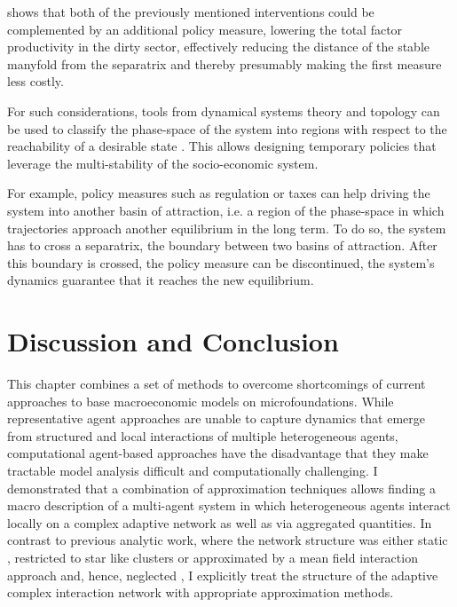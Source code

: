  shows that both of the previously mentioned interventions could be complemented by an additional policy measure, lowering the total factor productivity in the dirty sector, effectively reducing the distance of the stable manyfold from the separatrix and thereby presumably making the first measure less costly.

For such considerations, tools from dynamical systems theory and topology can be used to classify the phase-space of the system into regions with respect to the reachability of a desirable state \citep{Heitzig2016,Nitzbon2017}. This allows designing temporary policies that leverage the multi-stability of the socio-economic system.

For example, policy measures such as regulation or taxes can help driving the system into another basin of attraction, i.e. a region of the phase-space in which trajectories approach another equilibrium in the long term. To do so, the system has to cross a separatrix, the boundary between two basins of attraction.
After this boundary is crossed, the policy measure can be discontinued, the system's dynamics guarantee that it reaches the new equilibrium. 

\section{Discussion and Conclusion}
\label{sec:approx_conclusion}
This chapter combines a set of methods to overcome shortcomings of current approaches to base macroeconomic models on microfoundations.
While representative agent approaches are unable to capture dynamics that emerge from structured and local interactions of multiple heterogeneous agents, computational agent-based approaches have the disadvantage that they make tractable model analysis difficult and computationally challenging.
I demonstrated that a combination of approximation techniques allows finding a macro description of a multi-agent system in which heterogeneous agents interact locally on a complex adaptive network as well as via aggregated quantities. 
In contrast to previous analytic work, where the network structure was either static \cite{Lux2016}, restricted to star like clusters \cite{DiGuilmi2012} or approximated by a mean field interaction approach and, hence, neglected \citep{Aoki1998, Aoki2007, Alfarano2008a, DiGuilmi2008, Chiarella2011a}, I explicitly treat the structure of the adaptive complex interaction network with appropriate approximation methods.


